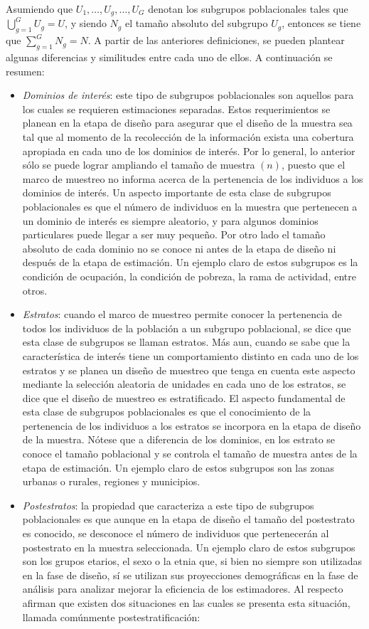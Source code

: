 \documentclass[
  10pt,
  spanish,
]{book}
\providecommand{\tightlist}{%
  \setlength{\itemsep}{0pt}\setlength{\parskip}{0pt}}
\begin{document}
Asumiendo que \(U_1, \ldots, U_g, \ldots, U_G\) denotan los subgrupos poblacionales tales que \(\bigcup_{g=1}^GU_g=U\), y siendo \(N_g\) el tamaño absoluto del subgrupo \(U_g\), entonces se tiene que \(\sum_{g=1}^G N_g=N\). A partir de las anteriores definiciones, se pueden plantear algunas diferencias y similitudes entre cada uno de ellos. A continuación se resumen:

\begin{itemize}
\tightlist
\item
  \emph{Dominios de interés}: este tipo de subgrupos poblacionales son aquellos para los cuales se requieren estimaciones separadas. Estos requerimientos se planean en la etapa de diseño para asegurar que el diseño de la muestra sea tal que al momento de la recolección de la información exista una cobertura apropiada en cada uno de los dominios de interés. Por lo general, lo anterior sólo se puede lograr ampliando el tamaño de muestra \((n)\), puesto que el marco de muestreo no informa acerca de la pertenencia de los individuos a los dominios de interés. Un aspecto importante de esta clase de subgrupos poblacionales es que el número de individuos en la muestra que pertenecen a un dominio de interés es siempre aleatorio, y para algunos dominios particulares puede llegar a ser muy pequeño. Por otro lado el tamaño absoluto de cada dominio no se conoce ni antes de la etapa de diseño ni después de la etapa de estimación. Un ejemplo claro de estos subgrupos es la condición de ocupación, la condición de pobreza, la rama de actividad, entre otros.
\item
  \emph{Estratos}: cuando el marco de muestreo permite conocer la pertenencia de todos los individuos de la población a un subgrupo poblacional, se dice que esta clase de subgrupos se llaman estratos. Más aun, cuando se sabe que la característica de interés tiene un comportamiento distinto en cada uno de los estratos y se planea un diseño de muestreo que tenga en cuenta este aspecto mediante la selección aleatoria de unidades en cada uno de los estratos, se dice que el diseño de muestreo es estratificado. El aspecto fundamental de esta clase de subgrupos poblacionales es que el conocimiento de la pertenencia de los individuos a los estratos se incorpora en la etapa de diseño de la muestra. Nótese que a diferencia de los dominios, en los estrato se conoce el tamaño poblacional y se controla el tamaño de muestra antes de la etapa de estimación. Un ejemplo claro de estos subgrupos son las zonas urbanas o rurales, regiones y municipios.
\item
  \emph{Postestratos}: la propiedad que caracteriza a este tipo de subgrupos poblacionales es que aunque en la etapa de diseño el tamaño del postestrato es conocido, se desconoce el número de individuos que pertenecerán al postestrato en la muestra seleccionada. Un ejemplo claro de estos subgrupos son los grupos etarios, el sexo o la etnia que, si bien no siempre son utilizadas en la fase de diseño, sí se utilizan sus proyecciones demográficas en la fase de análisis para analizar mejorar la eficiencia de los estimadores. Al respecto \citet{Sarndal_Swensson_Wretman_2003} afirman que existen dos situaciones en las cuales se presenta esta situación, llamada comúnmente postestratificación:


\end{itemize}
\end{document}
